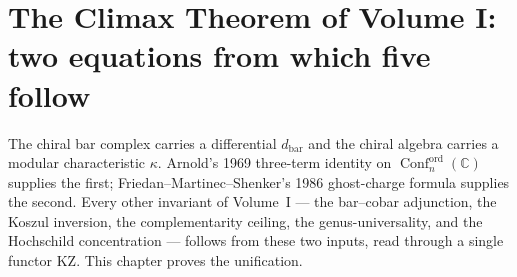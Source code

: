 %
%

\chapter[The Climax]{The Climax Theorem of Volume I: two equations from which five follow}
\label{ch:climax-two-equations-wave17}

\providecommand{\Conf}{\operatorname{Conf}}
\providecommand{\Ran}{\operatorname{Ran}}
\providecommand{\fg}{\mathfrak{g}}
\providecommand{\Bord}{B^{\mathrm{ord}}}
\providecommand{\Vir}{\mathrm{Vir}}
\providecommand{\Heis}{\mathcal{H}}
\providecommand{\KZ}{\mathrm{KZ}}
\providecommand{\Arn}{\nabla_{\mathrm{Arnold}}}
\providecommand{\dbar}{d_{\mathrm{bar}}}
\providecommand{\cghost}{c_{\mathrm{ghost}}}
\providecommand{\BRST}{\mathrm{BRST}}
\providecommand{\HH}{\mathrm{HH}}
\providecommand{\DS}{\mathrm{DS}}
\providecommand{\Hom}{\mathrm{Hom}}
\providecommand{\cE}{\mathcal{E}}
\providecommand{\cM}{\mathcal{M}}

The chiral bar complex carries a differential $\dbar$ and the chiral
algebra carries a modular characteristic $\kappa$. Arnold's 1969
three-term identity on $\Conf_n^{\mathrm{ord}}(\mathbb{C})$ supplies the
first; Friedan--Martinec--Shenker's 1986 ghost-charge formula supplies
the second. Every other invariant of Volume~I --- the bar--cobar
adjunction, the Koszul inversion, the complementarity ceiling, the
genus-universality, and the Hochschild concentration --- follows from
these two inputs, read through a single functor $\KZ$. This chapter
proves the unification.

